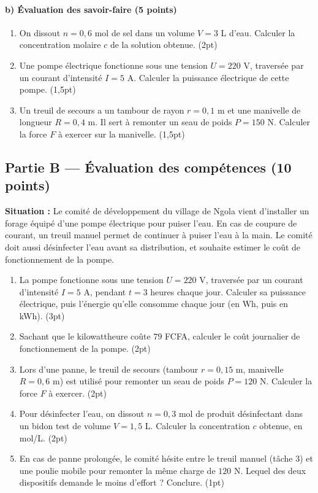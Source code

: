 \paragraph{b) Évaluation des savoir-faire (5 points)}
\begin{enumerate}[label=\arabic*)]
\item On dissout $n=0{,}6$ mol de sel dans un volume $V=3$ L d'eau. Calculer la
concentration molaire $c$ de la solution obtenue. \hfill (2pt)
\item Une pompe électrique fonctionne sous une tension $U=220$ V, traversée par un courant
d'intensité $I=5$ A. Calculer la puissance électrique de cette pompe. \hfill (1,5pt)
\item Un treuil de secours a un tambour de rayon $r=0{,}1$ m et une manivelle de longueur
$R=0{,}4$ m. Il sert à remonter un seau de poids $P=150$ N. Calculer la force $F$ à
exercer sur la manivelle. \hfill (1,5pt)
\end{enumerate}

\subsection*{Partie B — Évaluation des compétences (10 points)}

\noindent\textbf{Situation :} Le comité de développement du village de Ngola vient
d'installer un forage équipé d'une pompe électrique pour puiser l'eau. En cas de coupure de
courant, un treuil manuel permet de continuer à puiser l'eau à la main. Le comité doit
aussi désinfecter l'eau avant sa distribution, et souhaite estimer le coût de
fonctionnement de la pompe.

\begin{enumerate}[label=\textbf{Tâche \arabic*.}, leftmargin=2.2cm]
\item La pompe fonctionne sous une tension $U=220$ V, traversée par un courant
d'intensité $I=5$ A, pendant $t=3$ heures chaque jour. Calculer sa puissance électrique,
puis l'énergie qu'elle consomme chaque jour (en Wh, puis en kWh). \hfill (3pt)
\item Sachant que le kilowattheure coûte $79$ FCFA, calculer le coût journalier de
fonctionnement de la pompe. \hfill (2pt)
\item Lors d'une panne, le treuil de secours (tambour $r=0{,}15$ m, manivelle
$R=0{,}6$ m) est utilisé pour remonter un seau de poids $P=120$ N. Calculer la force $F$
à exercer. \hfill (2pt)
\item Pour désinfecter l'eau, on dissout $n=0{,}3$ mol de produit désinfectant dans un
bidon test de volume $V=1{,}5$ L. Calculer la concentration $c$ obtenue, en mol/L.
\hfill (2pt)
\item En cas de panne prolongée, le comité hésite entre le treuil manuel (tâche 3) et une
poulie mobile pour remonter la même charge de $120$ N. Lequel des deux dispositifs demande
le moins d'effort ? Conclure. \hfill (1pt)
\end{enumerate}

